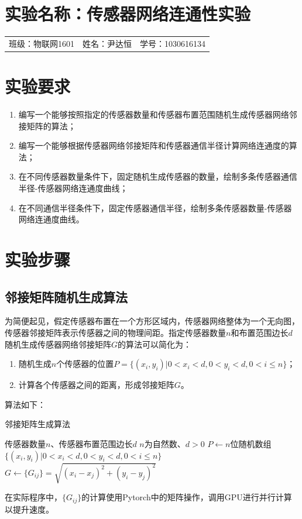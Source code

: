 \documentclass[a4paper]{ctexart}
\begin{document}
\begin{spacing}{1}
\section{实验名称：传感器网络连通性实验}
\begin{tabular}{lll}
	班级：物联网1601&姓名：尹达恒&学号：1030616134\\
\end{tabular}
\section{实验要求}
\begin{enumerate}[1、]
	\item 编写一个能够按照指定的传感器数量和传感器布置范围随机生成传感器网络邻接矩阵的算法；
	\item 编写一个能够根据传感器网络邻接矩阵和传感器通信半径计算网络连通度的算法；
	\item 在不同传感器数量条件下，固定随机生成传感器的数量，绘制多条传感器通信半径-传感器网络连通度曲线；
	\item 在不同通信半径条件下，固定传感器通信半径，绘制多条传感器数量-传感器网络连通度曲线。
\end{enumerate}

\section{实验步骤}
\subsection{邻接矩阵随机生成算法}
为简便起见，假定传感器布置在一个方形区域内，传感器网络整体为一个无向图，传感器邻接矩阵表示传感器之间的物理间距。指定传感器数量$n$和布置范围边长$d$随机生成传感器网络邻接矩阵$G$的算法可以简化为：
\begin{enumerate}
	\item 随机生成$n$个传感器的位置$P=\{(x_i,y_i)|0<x_i<d,0<y_i<d,0<i\le n\}$；
	\item 计算各个传感器之间的距离，形成邻接矩阵$G$。
\end{enumerate}
算法如下：
\begin{algorithm}
	\caption{邻接矩阵生成算法}
	\label{a11}
	\begin{algorithmic}[1]
		\Require 传感器数量$n$、传感器布置范围边长$d$
		\Ensure $n$为自然数、$d>0$
		\State $P\gets n$位随机数组$\{(x_i,y_i)|0<x_i<d,0<y_i<d,0<i\le n\}$
		\State $G\gets \{G_{ij}\}=\sqrt{(x_i-x_j)^2+(y_i-y_j)^2}$
		\State {}  
		\EndFunction  
	\end{algorithmic}
\end{algorithm}
在实际程序中，$\{G_{ij}\}$的计算使用Pytorch中的矩阵操作，调用GPU进行并行计算以提升速度。


\end{spacing}
\end{document}
